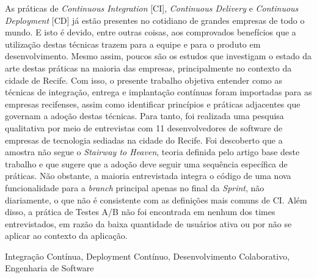 \resumo

As práticas de \emph{Continuous Integration} [CI], \emph{Continuous Delivery} e \emph{Continuous Deployment} [CD] já estão presentes no cotidiano de grandes empresas de todo o mundo. E isto é devido, entre outras coisas, aos comprovados benefícios que a utilização destas técnicas trazem para a equipe e para o produto em desenvolvimento. Mesmo assim, poucos são os estudos que investigam o estado da arte destas práticas na maioria das empresas, principalmente no contexto da cidade de Recife.  Com isso, o presente trabalho objetiva entender como as técnicas de integração, entrega e implantação contínuas foram importadas para as empresas recifenses, assim como identificar princípios e práticas adjacentes que governam a adoção destas técnicas. Para tanto, foi realizada uma pesquisa qualitativa por meio de entrevistas com 11 desenvolvedores de software de empresas de tecnologia sediadas na cidade do Recife. Foi descoberto que a amostra não segue o \emph{Stairway to Heaven}, teoria definida pelo artigo base deste trabalho e que sugere que a adoção deve seguir uma sequência específica de práticas. Não obstante, a maioria entrevistada integra o código de uma nova funcionalidade para a \emph{branch} principal apenas no final da \emph{Sprint}, não diariamente, o que não é consistente com as definições mais comuns de CI. Além disso, a prática de Testes A/B não foi encontrada em nenhum dos times entrevistados, em razão da baixa quantidade de usuários ativa ou por não se aplicar ao contexto da aplicação.

\begin{keywords}
    Integração Contínua, Deployment Contínuo, Desenvolvimento Colaborativo, Engenharia de Software
\end{keywords}
